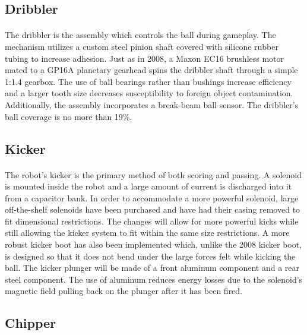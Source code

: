 \documentclass{llncs}
\begin{document}
\subsection{Dribbler}
\paragraph{}
The dribbler is the assembly which controls the ball during gameplay. The mechanism utilizes a custom steel pinion shaft covered with silicone rubber tubing to increase adhesion. Just as in 2008, a Maxon EC16 brushless motor mated to a GP16A planetary gearhead spins the dribbler shaft through a simple 1:1.4 gearbox. The use of ball bearings rather than bushings increase efficiency and a larger tooth size decreases susceptibility to foreign object contamination. Additionally, the assembly incorporates a break-beam ball sensor. The dribbler's ball coverage is no more than 19\%.

\subsection{Kicker}
\paragraph{}
The robot's kicker is the primary method of both scoring and passing. A solenoid is mounted inside the robot and a large amount of current is discharged into it from a capacitor bank. In order to accommodate a more powerful solenoid, large off-the-shelf solenoids have been purchased and have had their casing removed to fit dimensional restrictions. The changes will allow for more powerful kicks while still allowing the kicker system to fit within the same size restrictions. A more robust kicker boot has also been implemented which, unlike the 2008 kicker boot, is designed so that it does not bend under the large forces felt while kicking the ball. The kicker plunger will be made of a front aluminum component and a rear steel component. The use of aluminum reduces energy losses due to the solenoid's magnetic field pulling back on the plunger after it has been fired.

\subsection{Chipper}
\end{document}
